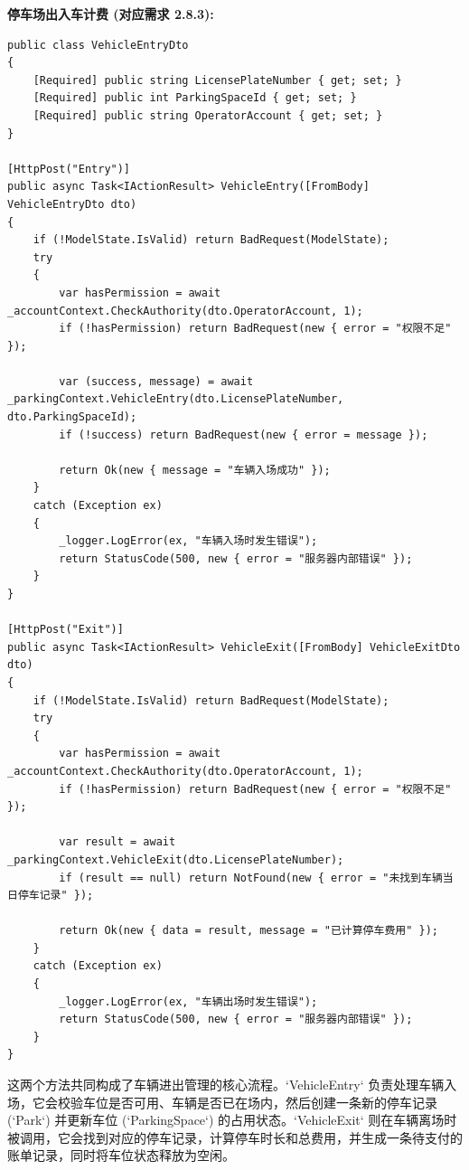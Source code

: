 \documentclass[]{article}
\begin{document}
\textbf{停车场出入车计费 (对应需求 2.8.3):}
\begin{verbatim}
public class VehicleEntryDto
{
    [Required] public string LicensePlateNumber { get; set; }
    [Required] public int ParkingSpaceId { get; set; }
    [Required] public string OperatorAccount { get; set; }
}

[HttpPost("Entry")]
public async Task<IActionResult> VehicleEntry([FromBody] VehicleEntryDto dto)
{
    if (!ModelState.IsValid) return BadRequest(ModelState);
    try
    {
        var hasPermission = await _accountContext.CheckAuthority(dto.OperatorAccount, 1);
        if (!hasPermission) return BadRequest(new { error = "权限不足" });

        var (success, message) = await _parkingContext.VehicleEntry(dto.LicensePlateNumber, dto.ParkingSpaceId);
        if (!success) return BadRequest(new { error = message });

        return Ok(new { message = "车辆入场成功" });
    }
    catch (Exception ex)
    {
        _logger.LogError(ex, "车辆入场时发生错误");
        return StatusCode(500, new { error = "服务器内部错误" });
    }
}

[HttpPost("Exit")]
public async Task<IActionResult> VehicleExit([FromBody] VehicleExitDto dto)
{
    if (!ModelState.IsValid) return BadRequest(ModelState);
    try
    {
        var hasPermission = await _accountContext.CheckAuthority(dto.OperatorAccount, 1);
        if (!hasPermission) return BadRequest(new { error = "权限不足" });

        var result = await _parkingContext.VehicleExit(dto.LicensePlateNumber);
        if (result == null) return NotFound(new { error = "未找到车辆当日停车记录" });

        return Ok(new { data = result, message = "已计算停车费用" });
    }
    catch (Exception ex)
    {
        _logger.LogError(ex, "车辆出场时发生错误");
        return StatusCode(500, new { error = "服务器内部错误" });
    }
}
\end{verbatim}
这两个方法共同构成了车辆进出管理的核心流程。`VehicleEntry` 负责处理车辆入场，它会校验车位是否可用、车辆是否已在场内，然后创建一条新的停车记录 (`Park`) 并更新车位 (`ParkingSpace`) 的占用状态。`VehicleExit` 则在车辆离场时被调用，它会找到对应的停车记录，计算停车时长和总费用，并生成一条待支付的账单记录，同时将车位状态释放为空闲。
\end{document}
